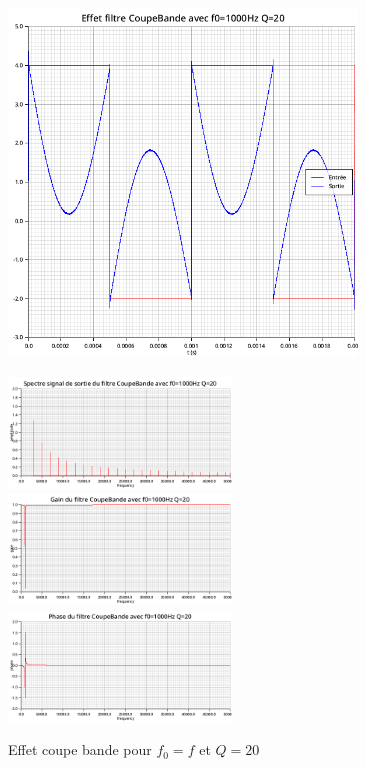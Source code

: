 \documentclass{article}
\begin{document}
\begin{figure}[H]
  \begin{minipage}{0.6\textwidth}
      \centering
      \includegraphics[width=25em]{images/creneau/rejecteur/q=20/1/signals.png}
  \end{minipage}
  \begin{minipage}{0.3\textwidth}
      \centering
      \includegraphics[width=16em]{images/creneau/rejecteur/q=20/1/fft_out.png}
      \vfill
      \includegraphics[width=16em]{images/creneau/rejecteur/q=20/1/gain.png}
      \vfill
      \includegraphics[width=16em]{images/creneau/rejecteur/q=20/1/phase.png}
  \end{minipage}
  \caption{Effet coupe bande pour $f_0=f$ et $Q=20$}
\end{figure}
\end{document}
